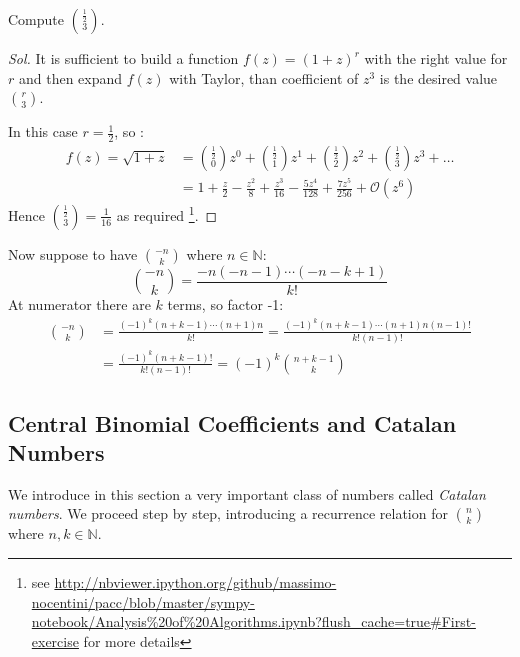 \begin{exercise}
  \label{exercise:first-on-comb-with-real}
  Compute ${{ \frac{1}{2} }\choose{3}} $.
\end{exercise}
\begin{proof}[Sol]
  It is sufficient to build a function $f(z) = (1+z)^r$ with the right
  value for $r$ and then expand $f(z)$ with Taylor, than coefficient of
  $z^3$ is the desired value ${{ r }\choose{3}} $.

  In this case $r= \frac{1}{2} $, so :
  \begin{displaymath}
      \begin{split}
          f(z) = \sqrt{1+z} &=
          {{\frac{1}{2}}\choose{0}}z^0 + {{\frac{1}{2}}\choose{1}}z^1 +
          {{\frac{1}{2}}\choose{2}}z^2 + {{\frac{1}{2}}\choose{3}}z^3 + \ldots \\
          &= 1 + \frac{z}{2} - \frac{z^{2}}{8} + \frac{z^{3}}{16} - \frac{5 z^{4}}{128} + \frac{7 z^{5}}{256} + \mathcal{O}\left(z^{6}\right)
      \end{split}
  \end{displaymath}
  Hence $ { \frac{1}{2} \choose {3} } = \frac{1}{16}$ as required \footnote{
      see \url{http://nbviewer.ipython.org/github/massimo-nocentini/pacc/blob/master/sympy-notebook/Analysis\%20of\%20Algorithms.ipynb?flush_cache=true\#First-exercise}
      for more details}.

\end{proof}

Now suppose to have ${{-n}\choose{k}}$ where $ n\in \mathbb{N}  $:
\begin{displaymath}
  {{-n}\choose{k}} =  \frac{-n(-n-1)\cdots(-n-k+1)}{k!}
\end{displaymath}
At numerator there are $k$ terms, so factor -1:
\begin{displaymath}
  \begin{split}
    {{-n}\choose{k}} &= \frac{(-1)^k (n + k-1)\cdots(n+1)n}{k!} =
    \frac{(-1)^k (n + k-1)\cdots(n+1)n(n-1)!}{k!(n-1)!}\\
    &= \frac{(-1)^k (n + k-1)!}{k!(n-1)!} = (-1)^k {{n+k-1}\choose{k}}
  \end{split}
\end{displaymath}

\subsection{Central Binomial Coefficients and Catalan Numbers}

We introduce in this section a very important class of
numbers called \emph{Catalan numbers}. We proceed step by step,
introducing a recurrence relation for ${{n}\choose{k}}$ where $n,k\in
\mathbb{N} $.

